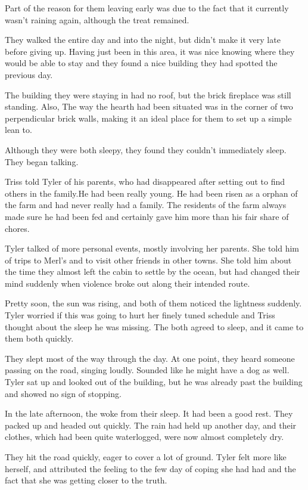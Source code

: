 \documentclass[courier]{sffms}
\begin{document}
Part of the reason for them leaving early was
due to the fact that it currently wasn't raining
again, although the treat remained.

They walked the entire day and into the night,
but didn't make it very late before giving up.
Having just been in this area, it was nice
knowing where they would be able to stay and
they found a nice building they had spotted
the previous day.

The building they were staying in had no roof,
but the brick fireplace was still standing. Also,
The way the hearth had been situated was in
the corner of two perpendicular brick walls,
making it an ideal place for them to set up a
simple lean to.

Although they were both sleepy, they found they
couldn't immediately sleep. They began talking.

Triss told Tyler of his parents, who had
disappeared after setting out to find others in
the family.He had been really young. He had
been risen as a orphan of the farm and had
never really had a family. The residents of
the farm always made sure he had been fed
and certainly gave him more than his fair share
of chores.

Tyler talked of more personal events, mostly
involving her parents. She told him of trips
to Merl's and to visit other friends in other
towns. She told him about the time they almost
left the cabin to settle by the ocean, but 
had changed their mind suddenly when
violence broke out along their intended route.

Pretty soon, the sun was rising, and both of
them noticed the lightness suddenly. Tyler
worried if this was going to hurt her finely
tuned schedule and Triss thought about the
sleep he was missing. The both agreed to
sleep, and it came to them both quickly.

They slept most of the way through the
day. At one point, they heard someone
passing on the road, singing loudly. Sounded
like he might have a dog as well. Tyler sat up
and looked out of the building, but he was
already past the building and showed no
sign of stopping.

In the late afternoon, the woke from their sleep.
It had been a good rest. They packed up
and headed out quickly. The rain had held
up another day, and their clothes, which had
been quite waterlogged, were now almost completely
dry.

They hit the road quickly, eager to cover a lot
of ground. Tyler felt more like herself, and
attributed the feeling to the few day of coping
she had had and the fact that she was getting
closer to the truth.
\end{document}
